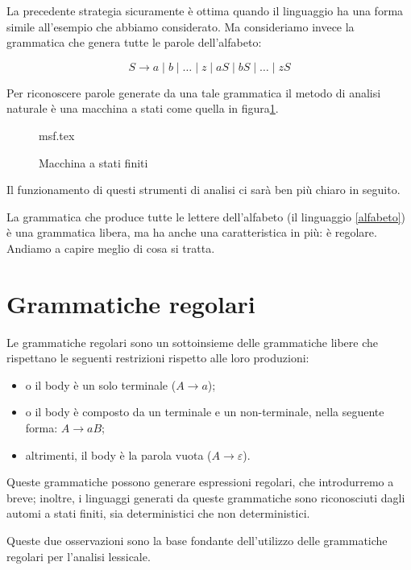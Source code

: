 \documentclass[class=book, crop=false, oneside, 12pt]{standalone}
\begin{document}
La precedente strategia sicuramente è ottima quando il linguaggio ha una forma simile all'esempio che abbiamo considerato. Ma consideriamo invece la grammatica che genera tutte le parole dell’alfabeto:

\begin{equation}
    \label{alfabeto}
    S \to a \mid b \mid … \mid z \mid aS \mid bS \mid … \mid zS
\end{equation}

Per riconoscere parole generate da una tale grammatica il metodo di analisi naturale è una macchina a stati come quella in figura\ref{macchina_a_stati_finiti}.

\begin{figure}[htb]
	\centering
	{msf.tex}
	\label{macchina_a_stati_finiti}
    \caption{Macchina a stati finiti}
\end{figure}

\noindent Il funzionamento di questi strumenti di analisi ci sarà ben più chiaro in seguito.

La grammatica che produce tutte le lettere dell’alfabeto (il linguaggio \ref{alfabeto}) è una grammatica libera, ma ha anche una caratteristica in più: è regolare. Andiamo a capire meglio di cosa si tratta.


\section{Grammatiche regolari}

Le grammatiche regolari sono un sottoinsieme delle grammatiche libere che rispettano le seguenti restrizioni rispetto alle loro produzioni:

\begin{itemize}
    \item o il body è un solo terminale (\(A \to a\));
    \item o il body è composto da un terminale e un non-terminale, nella seguente forma: \(A \to aB\);  
    \item altrimenti, il body è la parola vuota (\(A \to \varepsilon\)).
\end{itemize}

Queste grammatiche possono generare espressioni regolari, che introdurremo a breve; inoltre, i linguaggi generati da queste grammatiche sono riconosciuti dagli automi a stati finiti, sia deterministici che non deterministici.

Queste due osservazioni sono la base fondante dell'utilizzo delle grammatiche regolari per l’analisi lessicale.
\end{document}
